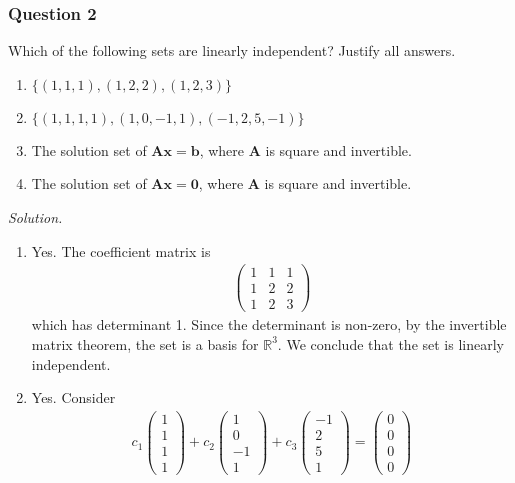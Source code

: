 \documentclass[12pt]{article}
\begin{document}
\subsubsection*{Question 2}
Which of the following sets are linearly independent?
Justify all answers.
\begin{enumerate}[label=\textbf{(\alph*)}]
\itemsep 0em
  \item $\{(1,1,1),(1,2,2),(1,2,3)\}$
  \item $\{(1,1,1,1),(1,0,-1,1),(-1,2,5,-1)\}$
  \item The solution set of $\mathbf{Ax}=\mathbf{b}$, where $\mathbf{A}$ is square and invertible.
  \item The solution set of $\mathbf{Ax}=\mathbf{0}$, where $\mathbf{A}$ is square and invertible.
\end{enumerate}
\noindent\emph{Solution.}\begin{enumerate}[label=\textbf{(\alph*)}]
    \itemsep 0em
    \item Yes. The coefficient matrix is \begin{align*}
        \begin{pmatrix}
            1&1&1\\1&2&2\\1&2&3
        \end{pmatrix}
    \end{align*}
    which has determinant 1. Since the determinant is non-zero, by the invertible matrix theorem, the set is a basis for $\mathbb{R}^3$. We conclude that the set is linearly independent.
    \item Yes. Consider \begin{align*}
        c_1\begin{pmatrix}
            1\\1\\1\\1
        \end{pmatrix}+c_2\begin{pmatrix}
            1\\0\\-1\\1
        \end{pmatrix}+c_3\begin{pmatrix}
            -1\\2\\5\\1
        \end{pmatrix}=\begin{pmatrix}
            0\\0\\0\\0

\end{pmatrix}
\end{align*}
\end{enumerate}
\end{document}
